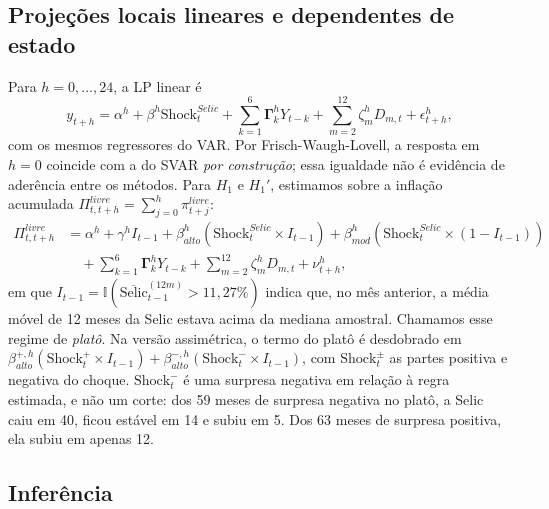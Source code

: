 \documentclass[12pt,a4paper]{article}
\begin{document}
\subsection{Projeções locais lineares e dependentes de estado}

Para $h = 0, \dots, 24$, a LP linear é
\begin{equation}
y_{t+h} = \alpha^h + \beta^h \text{Shock}_t^{Selic} + \sum_{k=1}^6 \mathbf{\Gamma}_k^h Y_{t-k} + \sum_{m=2}^{12} \zeta_m^h D_{m,t} + \epsilon_{t+h}^h,
\label{eq:lp_linear}
\end{equation}
com os mesmos regressores do VAR. Por Frisch-Waugh-Lovell, a resposta em $h = 0$ coincide com a do SVAR \emph{por construção}; essa igualdade não é evidência de aderência entre os métodos. Para $H_1$ e $H_1'$, estimamos sobre a inflação acumulada $\Pi_{t,t+h}^{livre} = \sum_{j=0}^{h} \pi_{t+j}^{livre}$:
\begin{equation}
\begin{aligned}
\Pi_{t, t+h}^{livre} &= \alpha^h + \gamma^h I_{t-1} + \beta_{alto}^h \left( \text{Shock}_t^{Selic} \times I_{t-1} \right) + \beta_{mod}^h \left( \text{Shock}_t^{Selic} \times (1 - I_{t-1}) \right) \\
&\quad + \sum_{k=1}^6 \mathbf{\Gamma}_k^h Y_{t-k} + \sum_{m=2}^{12} \zeta_m^h D_{m,t} + \nu_{t+h}^h,
\end{aligned}
\label{eq:lp_state}
\end{equation}
em que $I_{t-1} = \mathbb{I}(\overline{\text{Selic}}_{t-1}^{(12m)} > 11{,}27\%)$ indica que, no mês anterior, a média móvel de 12 meses da Selic estava acima da mediana amostral. Chamamos esse regime de \emph{platô}. Na versão assimétrica, o termo do platô é desdobrado em $\beta_{alto}^{+,h}(\text{Shock}_t^+ \times I_{t-1}) + \beta_{alto}^{-,h}(\text{Shock}_t^- \times I_{t-1})$, com $\text{Shock}_t^{\pm}$ as partes positiva e negativa do choque. $\text{Shock}_t^-$ é uma surpresa negativa em relação à regra estimada, e não um corte: dos 59 meses de surpresa negativa no platô, a Selic caiu em 40, ficou estável em 14 e subiu em 5. Dos 63 meses de surpresa positiva, ela subiu em apenas 12.

\subsection{Inferência}
\end{document}
